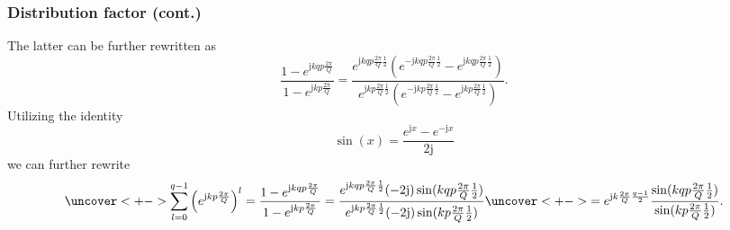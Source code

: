\begin{frame}
	\frametitle{Distribution factor  (cont.)}
    \onslide<+->
    The latter can be further rewritten as
    $$
    \frac{1-e^{\mathrm{j} k q p\frac{2\pi}{Q}}}{1-e^{\mathrm{j} k p\frac{2\pi}{Q}}} = \frac{e^{\mathrm{j} k q p\frac{2\pi}{Q}\frac{1}{2}}\left(e^{-\mathrm{j} k q p\frac{2\pi}{Q}\frac{1}{2}}-e^{\mathrm{j} k q p\frac{2\pi}{Q}\frac{1}{2}}\right)}{e^{\mathrm{j} k p\frac{2\pi}{Q}\frac{1}{2}}\left(e^{-\mathrm{j} k p\frac{2\pi}{Q}\frac{1}{2}}-e^{\mathrm{j} k p\frac{2\pi}{Q}\frac{1}{2}}\right)}.
    $$
    \onslide<+->
    Utilizing the identity
    $$
    \sin(x) = \frac{e^{\mathrm{j} x}-e^{-\mathrm{j} x}}{2\mathrm{j}}
    $$
    \onslide<+->
    we can further rewrite
    \begin{equation}
        \uncover<+->{\sum_{l=0}^{q-1} \left(e^{\mathrm{j} k  p\frac{2\pi}{Q}}\right)^l =\frac{1-e^{\mathrm{j} k q p\frac{2\pi}{Q}}}{1-e^{\mathrm{j} k p\frac{2\pi}{Q}}} = \frac{e^{\mathrm{j} k q p\frac{2\pi}{Q}\frac{1}{2}}(-2\mathrm{j})\sin(k q p\frac{2\pi}{Q}\frac{1}{2})}{e^{\mathrm{j} k p\frac{2\pi}{Q}\frac{1}{2}}(-2\mathrm{j})\sin(k p\frac{2\pi}{Q}\frac{1}{2})}}\uncover<+->{=e^{\mathrm{j}k\frac{2 \pi}{Q}\frac{q-1}{2}}\frac{\sin(k q p\frac{2\pi}{Q}\frac{1}{2})}{\sin(k p\frac{2\pi}{Q}\frac{1}{2})}.}
        \label{eq:sum_exp_distribution_factor_simplified}
    \end{equation}
\end{frame}

